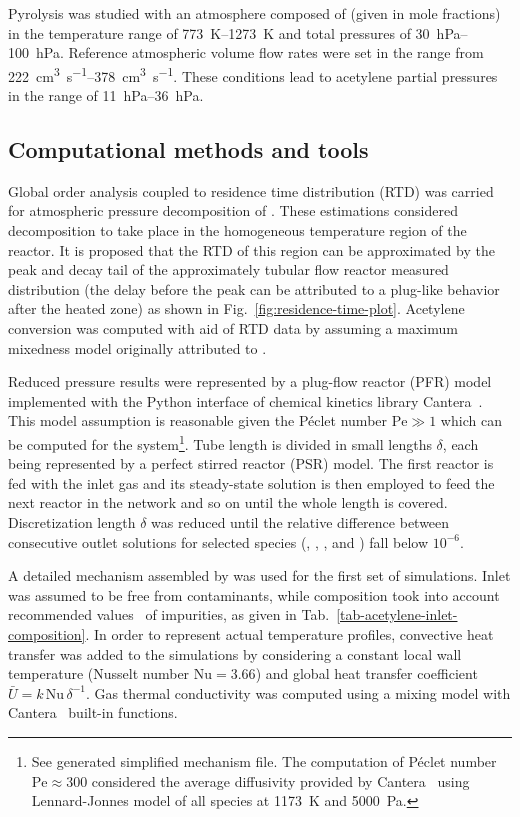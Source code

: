 \documentclass[final,3p,times,twocolumn,sort&compress]{elsarticle}
\begin{document}
Pyrolysis was studied with an atmosphere composed of  (given in mole fractions) in the temperature range of \SIrange{773}{1273}{\kelvin} and total pressures of \SIrange{30}{100}{\hecto\pascal}. Reference atmospheric volume flow rates were set in the range from \SIrange{222}{378}{\cubic\centi\metre\per\second}. These conditions lead to acetylene partial pressures in the range of \SIrange{11}{36}{\hecto\pascal}.

\subsection{Computational methods and tools}

Global order analysis coupled to residence time distribution (RTD) was carried for atmospheric pressure decomposition of . These estimations considered decomposition to take place in the homogeneous temperature region of the reactor. It is proposed that the RTD of this region can be approximated by the peak and decay tail of the approximately tubular flow reactor measured distribution (the delay before the peak can be attributed to a plug-like behavior after the heated zone) as shown in Fig.~\ref{fig:residence-time-plot}. Acetylene conversion was computed with aid of RTD data by assuming a maximum mixedness model originally attributed to \citet{Zwietering1959}.

Reduced pressure results were represented by a plug-flow reactor (PFR) model implemented with the Python interface of chemical kinetics library Cantera~\cite{Cantera2014}. This model assumption is reasonable given the  Péclet number $\mathrm{Pe}\gg{}1$ which can be computed for the system\footnote{See generated simplified mechanism file. The computation of Péclet number $\mathrm{Pe}\approx{}300$ considered the average diffusivity \textendash{} provided by Cantera~\cite{Cantera2014} using Lennard-Jonnes model \textendash{} of all species at \SI{1173}{\kelvin} and \SI{5000}{\pascal}.}. Tube length is divided in small lengths $\delta$, each being represented by a perfect stirred reactor (PSR) model. The first reactor is fed with the inlet gas and its steady-state solution is then employed to feed the next reactor in the network and so on until the whole length is covered. Discretization length $\delta$ was reduced until the relative difference between consecutive outlet solutions for selected species (, , ,  and ) fall below $10^{-6}$. 

A detailed mechanism assembled by \citet{Norinaga2009} was used for the first set of simulations. Inlet  was assumed to be free from contaminants, while  composition took into account recommended values~\cite{Norinaga2007} of impurities, as given in Tab.~\ref{tab-acetylene-inlet-composition}. In order to represent actual temperature profiles, convective heat transfer was added to the simulations by considering a constant local wall temperature (Nusselt number $\mathrm{Nu}=3.66$) and global heat transfer coefficient $\bar{U}=k\,\mathrm{Nu}\,\delta^{-1}$. Gas thermal conductivity was computed using a mixing model with Cantera~\cite{Cantera2014} built-in functions.
\end{document}

